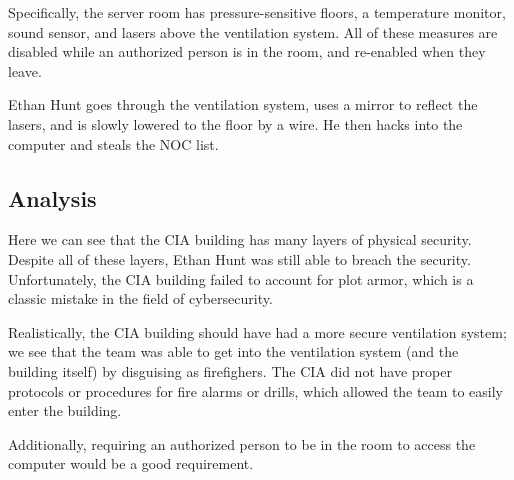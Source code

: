 \documentclass[acmlarge]{acmart}
\begin{document}
Specifically, the server room has pressure-sensitive floors, a temperature monitor,
sound sensor, and lasers above the ventilation system. All of these measures are disabled
while an authorized person is in the room, and re-enabled when they leave.

Ethan Hunt goes through the ventilation system, uses a mirror to reflect the
lasers, and is slowly lowered to the floor by a wire. He then hacks into the
computer and steals the NOC list.

\subsection{Analysis}
Here we can see that the CIA building has many layers of physical security.
Despite all of these layers, Ethan Hunt was still able to breach the security.
Unfortunately, the CIA building failed to account for plot armor, which is 
a classic mistake in the field of cybersecurity.

Realistically, the CIA building should have had a more secure ventilation system;
we see that the team was able to get into the ventilation system (and the building itself)
by disguising as firefighers. The CIA did not have proper protocols or procedures
for fire alarms or drills, which allowed the team to easily enter the building.

Additionally, requiring an authorized person to be in the room to access the
computer would be a good requirement.



\end{document}
